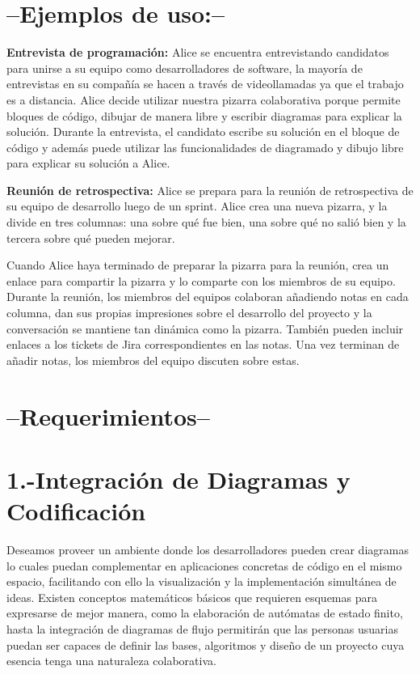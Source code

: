 \documentclass[a4paper, oneside, final]{scrartcl}
\begin{document}
\section{--Ejemplos de uso:--}

\textbf{Entrevista de programación:} Alice se encuentra entrevistando candidatos para unirse a su equipo como
    desarrolladores de software, la mayoría de entrevistas en su compañía se hacen a través de videollamadas ya que el trabajo es a distancia. Alice decide utilizar nuestra pizarra colaborativa porque permite bloques de código,
    dibujar de manera libre y escribir diagramas para explicar la solución. Durante la entrevista, el candidato escribe
    su solución en el bloque de código y además puede utilizar las funcionalidades de diagramado y dibujo libre para explicar su solución a Alice.

\textbf{Reunión de retrospectiva:} Alice se prepara para la reunión de retrospectiva de su equipo de desarrollo luego de un sprint. Alice crea una nueva pizarra, y la divide en tres columnas:
una sobre qué fue bien, una sobre qué no salió bien y la tercera sobre qué pueden mejorar.

Cuando Alice haya terminado de preparar la pizarra para la reunión, crea un enlace para compartir la pizarra y lo comparte con los miembros de su equipo. Durante la reunión, los miembros del equipos colaboran añadiendo notas en cada columna, dan sus propias impresiones sobre el desarrollo del proyecto y la conversación se mantiene tan dinámica como la pizarra. También pueden incluir enlaces a los tickets de Jira correspondientes en las notas. Una vez terminan de añadir notas, los miembros del equipo discuten sobre estas.
\clearpage

\section{--Requerimientos--}

\section{1.-Integración de Diagramas y Codificación}


  Deseamos proveer un ambiente donde los desarrolladores pueden crear diagramas lo cuales puedan complementar en aplicaciones concretas de
  código en el mismo espacio, facilitando con ello la visualización y la
  implementación simultánea de ideas. Existen conceptos matemáticos básicos que requieren esquemas para expresarse de mejor manera, como la elaboración de autómatas de estado finito, hasta
  la integración de diagramas de flujo permitirán que las personas usuarias puedan ser
  capaces de definir las bases, algoritmos y diseño de un proyecto cuya esencia
  tenga una naturaleza colaborativa.\\
\end{document}
